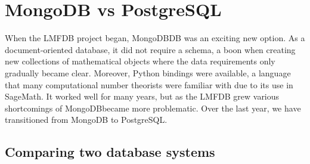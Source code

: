 \documentclass{article}
\begin{document}
\section{MongoDB vs PostgreSQL}

When the LMFDB project began, MongoDBDB was an exciting new option.  As a document-oriented database, it did not require a schema, a boon when creating new collections of mathematical objects where the data requirements only gradually became clear.  Moreover, Python bindings were available, a language that many computational number theorists were familiar with due to its use in SageMath.  It worked well for many years, but as the LMFDB grew various shortcomings of MongoDBbecame more problematic.  Over the last year, we have transitioned from MongoDB to PostgreSQL.

\subsection{Comparing two database systems}
\end{document}
